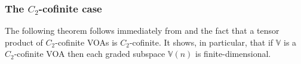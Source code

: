 \documentclass[11pt,b5paper,notitlepage]{article}
\theoremstyle{definition}
\theoremstyle{plain}
\newtheorem{pp}[df]{Proposition}
\newcommand{\wtd}{\widetilde}
\newcommand{\mbf}{\mathbf}
\newcommand{\Vbb}{\mathbb V}
\newcommand{\Wbb}{\mathbb W}
\newcommand{\Cbb}{\mathbb C}
\newcommand{\Nbb}{\mathbb N}
\newcommand{\Zbb}{\mathbb Z}
\newcommand{\<}{\left\langle}
\renewcommand{\>}{\right\rangle}
\numberwithin{equation}{section}
\begin{document}
\begin{comment}
Conversely, one may wonder whether a generalized $\Vbb_1\otimes\cdots\otimes\Vbb_N$-module is a finitely-admissible $\Vbb_1\times\cdots\times\Vbb_N$-module so that the main results about (partial) conformal blocks in this article can be applied to it. Here is one criterion:

\begin{pp}\label{lb46}
Let $\Wbb$ be a finitely-generated grading-restricted $\Vbb_1\otimes\cdots\otimes\Vbb_N$-module of countable dimension. Then $\Wbb$ is a finitely-admissible $\Vbb_1\times\cdots\times\Vbb_N$-module.
\end{pp}

Note that the assumption on countable dimension is redundant if the $L(0)$-graded subspaces of $\Vbb_1,\dots,\Vbb_N$ are finite-dimensional.

\begin{proof}



$E\subset\Cbb^N$ such that
\begin{align*}
\Wbb=\bigoplus_{(s_1,\dots,s_N)\in E+\Nbb^N} \Wbb_{[s_1,\dots,s_N]}
\end{align*}
that any two elements of $E$ do not differ by an element of $\Zbb^N$, and that each $\Wbb_{\alpha,[s_1,\dots,s_N]}$ is finite dimensional. We write $E=\{\mbf e_1,\mbf e_2,\dots\}$ where $\mbf e_k=(e_{k,1},\dots,e_{k,N})\in\Cbb^N$. Define a linear operator $\wtd L_i(0)$ on $\Wbb$ by
\begin{align*}
\wtd L_i(0)=k+s_i-e_{k,i} \qquad\text{ on }\Wbb_{[s_1,\dots,s_N]}\text{ if }(s_1,\dots,s_N)\in\mbf e_k+\Nbb^N
\end{align*} 
Then $\wtd L_1(0),\dots,\wtd L_N(0)$ make $\Wbb$ a finitely-admissible $\Vbb_1\times\cdots\times\Vbb_N$-module.
\end{proof}
\end{comment}













\subsubsection{The $C_2$-cofinite case}


The following theorem follows immediately from \cite[Lem. 2.4]{Miy-modular-invariance} and the fact that a tensor product of $C_2$-cofinite VOAs is $C_2$-cofinite. It shows, in particular, that if $\Vbb$ is a $C_2$-cofinite VOA then each graded subspace $\Vbb(n)$ is finite-dimensional.
\end{document}
